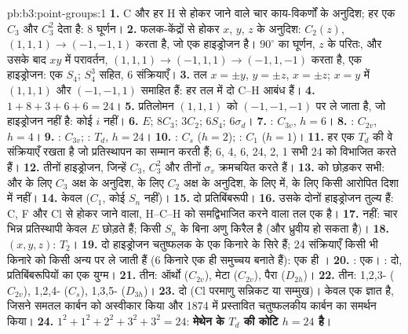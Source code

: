 \begin{solution}{pb:b3:point-groups:1}
\textbf{1.} C और हर H से होकर जाने वाले चार काय-विकर्णों के अनुदिश; हर एक
$C_3$ और $C_3^2$ देता है: 8 घूर्णन।
\textbf{2.} फलक-केंद्रों से होकर $x$, $y$, $z$ के अनुदिश: $C_2(z)$, $(1,1,1)
\to (-1,-1,1)$ करता है, जो एक हाइड्रोजन है। $90^\circ$ का घूर्णन, $z$ के परितः, और उसके बाद
$xy$ में परावर्तन, $(1,1,1) \to (-1,1,1) \to (-1,1,-1)$ करता है, एक हाइड्रोजन: एक
$S_4$; $S_4^3$ सहित, 6 संक्रियाएँ।
\textbf{3.} तल $x = \pm y$, $y = \pm z$, $x = \pm z$; $x = y$ में
$(1,1,1)$ और $(-1,-1,1)$ समाहित हैं: हर तल में दो C--H आबंध हैं।
\textbf{4.} $1 + 8 + 3 + 6 + 6 = 24$।
\textbf{5.} प्रतिलोमन $(1,1,1)$ को $(-1,-1,-1)$ पर ले जाता है, जो हाइड्रोजन नहीं है:
कोई $i$ नहीं।
\textbf{6.} $E$; $8C_3$; $3C_2$; $6S_4$; $6\sigma_d$।
\textbf{7.} : $C_{3v}$, $h = 6$।
\textbf{8.} : $C_{2v}$, $h = 4$।
\textbf{9.} : $C_{3v}$; : $T_d$, $h = 24$।
\textbf{10.} : $C_s$ ($h = 2$); : $C_1$ ($h = 1$)।
\textbf{11.} हर एक $T_d$ की वे संक्रियाएँ रखता है जो
प्रतिस्थापन का सम्मान करती हैं; 6, 4, 6, 24, 2, 1 सभी 24 को विभाजित करते हैं।
\textbf{12.} तीनों हाइड्रोजन, जिन्हें $C_3$, $C_3^2$ और तीनों
$\sigma_v$ क्रमचयित करते हैं।
\textbf{13.}  को छोड़कर सभी:  और  के लिए $C_3$ अक्ष के अनुदिश,
 के लिए $C_2$ अक्ष के अनुदिश,  के लिए  में,  के लिए
किसी आरोपित दिशा में नहीं।
\textbf{14.} केवल  ($C_1$, कोई $S_n$ नहीं)।
\textbf{15.} दो प्रतिबिंबरूपी।
\textbf{16.} उसके दोनों हाइड्रोजन तुल्य हैं: C, F और Cl से होकर जाने वाला, H--C--H को
समद्विभाजित करने वाला तल एक  है।
\textbf{17.} नहीं: चार भिन्न प्रतिस्थापी केवल $E$ छोड़ते हैं; किसी $S_n$ के बिना
अणु किरैल है (और ध्रुवीय हो सकता है)।
\textbf{18.} $(x, y, z)$: $T_2$।
\textbf{19.} दो हाइड्रोजन चतुष्फलक के एक किनारे के सिरे हैं; 24
संक्रियाएँ किसी भी किनारे को किसी अन्य पर ले जाती हैं (6 किनारे एक ही समुच्चय बनाते हैं): एक
ही ।
\textbf{20.} : एक। : दो, प्रतिबिंबरूपियों का एक युग्म।
\textbf{21.} तीन: ऑर्थो ($C_{2v}$), मेटा ($C_{2v}$), पैरा ($D_{2h}$)।
\textbf{22.} तीन: 1,2,3- ($C_{2v}$), 1,2,4- ($C_s$), 1,3,5- ($D_{3h}$)।
\textbf{23.} दो (Cl परमाणु सन्निकट या सम्मुख)। केवल एक 
ज्ञात है, जिसने समतल कार्बन को अस्वीकार किया और 1874 में प्रस्तावित
चतुष्फलकीय कार्बन का समर्थन किया।
\textbf{24.} $1^2 + 1^2 + 2^2 + 3^2 + 3^2 = 24$: \textbf{मेथेन के  $T_d$ की
कोटि $h = 24$ है}।
\end{solution}
